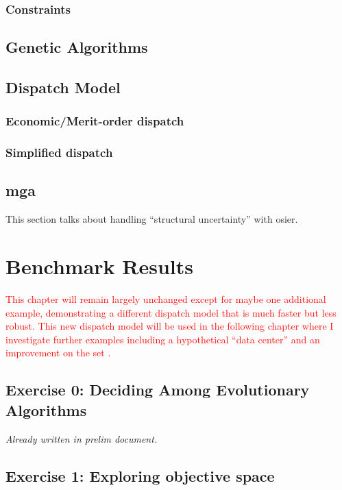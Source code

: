 \subsection{Constraints}

\section{Genetic Algorithms}

\section{Dispatch Model}

\subsection{Economic/Merit-order dispatch}

\subsection{Simplified dispatch}

\section{\acf{mga}}
This section talks about handling ``structural uncertainty'' with \ac{osier}.

\chapter{Benchmark Results}
\label{chapter:benchmark-results}

\textcolor{red}{This chapter will remain largely unchanged except for maybe one
additional example, demonstrating a different dispatch model that is much faster
but less robust. This new dispatch model will be used in the following chapter
where I investigate further examples including a hypothetical ``data center''
and an improvement on the \acf{set} \cite{wigeland_nuclear_2014}.}

\section{Exercise 0: Deciding Among Evolutionary Algorithms}

\textit{Already written in prelim document.}

\section{Exercise 1: Exploring objective space}


